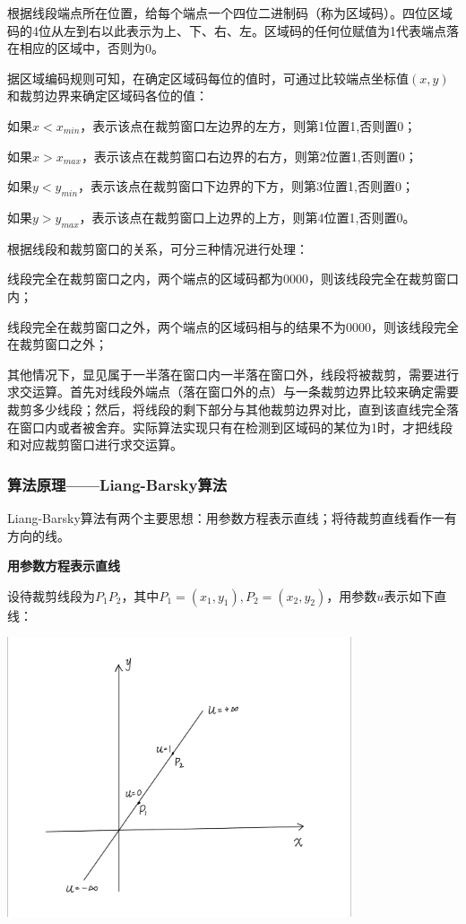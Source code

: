 \documentclass[a4paper,UTF8]{article}
\theoremstyle{definition}
\begin{document}
根据线段端点所在位置，给每个端点一个四位二进制码（称为区域码）。四位区域码的4位从左到右以此表示为上、下、右、左。区域码的任何位赋值为1代表端点落在相应的区域中，否则为0。

据区域编码规则可知，在确定区域码每位的值时，可通过比较端点坐标值$(x,y)$和裁剪边界来确定区域码各位的值：

如果$x<x_{min}$，表示该点在裁剪窗口左边界的左方，则第1位置1,否则置0；

如果$x>x_{max}$，表示该点在裁剪窗口右边界的右方，则第2位置1,否则置0；

如果$y<y_{min}$，表示该点在裁剪窗口下边界的下方，则第3位置1,否则置0；

如果$y>y_{max}$，表示该点在裁剪窗口上边界的上方，则第4位置1,否则置0。

根据线段和裁剪窗口的关系，可分三种情况进行处理：

线段完全在裁剪窗口之内，两个端点的区域码都为0000，则该线段完全在裁剪窗口内；

线段完全在裁剪窗口之外，两个端点的区域码相与的结果不为0000，则该线段完全在裁剪窗口之外；

其他情况下，显见属于一半落在窗口内一半落在窗口外，线段将被裁剪，需要进行求交运算。首先对线段外端点（落在窗口外的点）与一条裁剪边界比较来确定需要裁剪多少线段；然后，将线段的剩下部分与其他裁剪边界对比，直到该直线完全落在窗口内或者被舍弃。实际算法实现只有在检测到区域码的某位为1时，才把线段和对应裁剪窗口进行求交运算。

\subsubsection{算法原理——Liang-Barsky算法}

Liang-Barsky算法有两个主要思想：用参数方程表示直线；将待裁剪直线看作一有方向的线。

\textbf{用参数方程表示直线}

设待裁剪线段为$P_1P_2$，其中$P_1=(x_1,y_1),P_2=(x_2,y_2)$，用参数$u$表示如下直线：

\begin{center}
	\includegraphics[width=4in]{报告/2.png}
\end{center}
\end{document}
